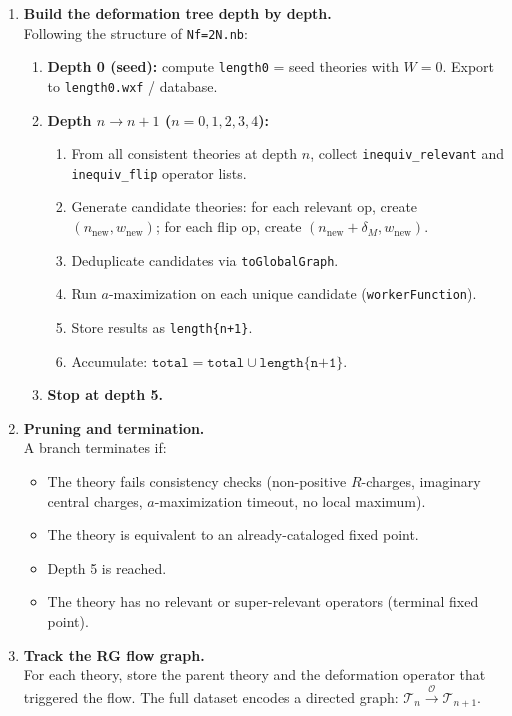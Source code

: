 \documentclass[12pt]{article}
\begin{document}
\begin{enumerate}[label=\textbf{5.\arabic*}]

\item \textbf{Build the deformation tree depth by depth.} \\
  Following the structure of \texttt{Nf=2N.nb}:
  \begin{enumerate}[label=(\alph*)]
    \item \textbf{Depth 0 (seed):} compute \texttt{length0} = seed theories with $W = 0$. Export to \texttt{length0.wxf} / database.
    \item \textbf{Depth $n \to n+1$ ($n = 0,1,2,3,4$):}
    \begin{enumerate}[label=\roman*.]
      \item From all consistent theories at depth $n$, collect \texttt{inequiv\_relevant} and \texttt{inequiv\_flip} operator lists.
      \item Generate candidate theories: for each relevant op, create $(n_{\mathrm{new}}, w_{\mathrm{new}})$; for each flip op, create $(n_{\mathrm{new}} + \delta_M, w_{\mathrm{new}})$.
      \item Deduplicate candidates via \texttt{toGlobalGraph}.
      \item Run $a$-maximization on each unique candidate (\texttt{workerFunction}).
      \item Store results as \texttt{length\{n+1\}}.
      \item Accumulate: $\texttt{total} = \texttt{total} \cup \texttt{length\{n+1\}}$.
    \end{enumerate}
    \item \textbf{Stop at depth 5.}
  \end{enumerate}

\item \textbf{Pruning and termination.} \\
  A branch terminates if:
  \begin{itemize}
    \item The theory fails consistency checks (non-positive $R$-charges, imaginary central charges, $a$-maximization timeout, no local maximum).
    \item The theory is equivalent to an already-cataloged fixed point.
    \item Depth 5 is reached.
    \item The theory has no relevant or super-relevant operators (terminal fixed point).
  \end{itemize}

\item \textbf{Track the RG flow graph.} \\
  For each theory, store the parent theory and the deformation operator that triggered the flow.
  The full dataset encodes a directed graph:
  $\mathcal{T}_n \xrightarrow{\mathcal{O}} \mathcal{T}_{n+1}$.

\end{enumerate}
\end{document}
